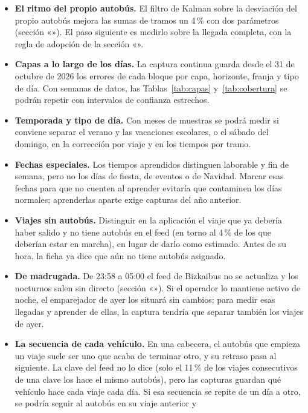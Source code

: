 \begin{itemize}
  \item \textbf{El ritmo del propio autobús.} El filtro de Kalman sobre la desviación del propio autobús mejora las
        sumas de tramos un 4\,\% con dos parámetros (sección «»). El paso siguiente es medirlo
        sobre la llegada completa, con la regla de adopción de la sección «».
  \item \textbf{Capas a lo largo de los días.} La captura continua guarda desde el 31 de octubre de 2026 los errores de
        cada bloque por capa, horizonte, franja y tipo de día. Con semanas de datos, las Tablas~\ref{tab:capas}
        y~\ref{tab:cobertura} se podrán repetir con intervalos de confianza estrechos.
  \item \textbf{Temporada y tipo de día.} Con meses de muestras se podrá medir si conviene separar el verano y las
        vacaciones escolares, o el sábado del domingo, en la corrección por viaje y en los tiempos por tramo.
  \item \textbf{Fechas especiales.} Los tiempos aprendidos distinguen laborable y fin de semana, pero no los días de
        fiesta, de eventos o de Navidad. Marcar esas fechas para que no cuenten al aprender evitaría que contaminen los días
        normales; aprenderlas aparte exige capturas del año anterior.
  \item \textbf{Viajes sin autobús.} Distinguir en la aplicación el viaje que ya debería haber salido y no tiene
        autobús en el feed (en torno al 4\,\% de los que deberían estar en marcha), en lugar de darlo como estimado.
        Antes de su hora, la ficha ya dice que aún no tiene autobús asignado.
  \item \textbf{De madrugada.} De 23:58 a 05:00 el feed de Bizkaibus no se actualiza y los nocturnos salen sin directo
        (sección «»). Si el operador lo mantiene activo de noche, el emparejador de ayer los situará sin
        cambios; para medir esas llegadas y aprender de ellas, la captura tendría que separar también los viajes de ayer.
  \item \textbf{La secuencia de cada vehículo.} En una cabecera, el autobús que empieza un viaje suele ser uno que
        acaba de terminar otro, y su retraso pasa al siguiente. La clave del feed no lo dice (solo el 11\,\% de los
        viajes consecutivos de una clave los hace el mismo autobús), pero las capturas guardan qué vehículo hace cada viaje
        cada día. Si esa secuencia se repite de un día a otro, se podría seguir al autobús en su viaje anterior y

\end{itemize}
